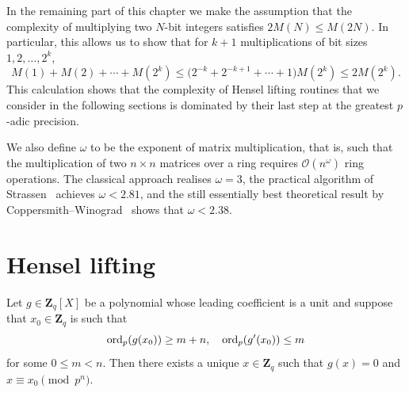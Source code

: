 In the remaining part of this chapter we make the assumption that 
the complexity of multiplying two $N$-bit integers satisfies 
$2 M(N) \leq M(2 N)$.  In particular, this allows us to show that 
for $k + 1$ multiplications of bit sizes $1, 2, \dotsc, 2^k$, 
\begin{equation}
M(1) + M(2) + \dotsb + M(2^k) \leq \bigl( 2^{-k} + 2^{-k+1} + \dotsb + 1 \bigr) M(2^k) \leq 2 M(2^k).
\end{equation}
This calculation shows that the complexity of Hensel lifting routines 
that we consider in the following sections is dominated by their last 
step at the greatest $p$-adic precision.

We also define $\omega$ to be the exponent of matrix multiplication, 
that is, such that the multiplication of two $n \times n$ matrices 
over a ring requires $\mathcal{O}(n^{\omega})$ ring operations.  The 
classical approach realises $\omega = 3$, the practical algorithm 
of Strassen~\citep{Strassen1969} achieves $\omega < 2.81$, and 
the still essentially best theoretical result by 
Coppersmith--Winograd~\citep{CoppersmithWinograd1990} shows 
that $\omega < 2.38$.

\section{Hensel lifting}

\begin{thm} \label{thm:Hensel1}
Let $g \in \mathbf{Z}_q[X]$ be a polynomial whose leading coefficient 
is a unit and suppose that $x_0 \in \mathbf{Z}_q$ is such that 
\begin{equation*}
\operatorname{ord}_p(g(x_0)) \geq m + n, \quad \operatorname{ord}_p(g'(x_0)) \leq m
\end{equation*}
for some $0 \leq m < n$.  Then there exists a unique $x \in \mathbf{Z}_q$ 
such that $g(x) = 0$ and $x \equiv x_0 \pmod{p^n}$.
\end{thm}

